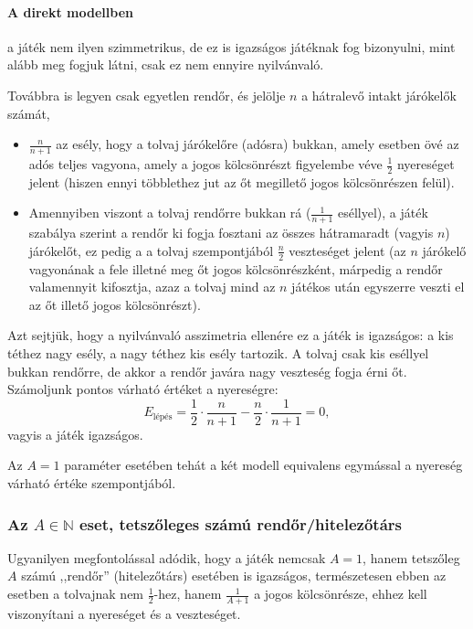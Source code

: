 \documentclass{article}
\begin{document}
	\paragraph{A direkt modellben} a játék nem ilyen szimmetrikus, de ez is igazságos játéknak fog bizonyulni, mint alább meg fogjuk látni, csak ez nem ennyire nyilvánvaló.

	Továbbra is legyen csak egyetlen rendőr, és jelölje $n$ a hátralevő intakt járókelők számát,
	\begin{itemize}	
		\item $\frac{n}{n+1}$ az esély, hogy a tolvaj járókelőre (adósra) bukkan, amely esetben övé az adós teljes vagyona, amely a jogos kölcsönrészt figyelembe véve $\frac12$ nyereséget jelent (hiszen ennyi többlethez jut az őt megillető jogos kölcsönrészen felül).
		\item Amennyiben viszont a tolvaj rendőrre bukkan rá ($\frac1{n+1}$ eséllyel), a játék szabálya szerint a rendőr ki fogja fosztani az összes hátramaradt (vagyis $n$) járókelőt, ez pedig a a tolvaj szempontjából $\frac n2$ veszteséget jelent (az $n$ járókelő vagyonának a fele illetné meg őt jogos kölcsönrészként, márpedig a rendőr valamennyit kifosztja, azaz a tolvaj mind az $n$ játékos után egyszerre veszti el az őt illető jogos kölcsönrészt).
	\end{itemize}
	Azt sejtjük, hogy a nyilvánvaló asszimetria ellenére ez a játék is igazságos: a kis téthez nagy esély, a nagy téthez kis esély tartozik. A tolvaj csak kis eséllyel bukkan rendőrre, de akkor a rendőr javára nagy veszteség fogja érni őt.
	Számoljunk pontos várható értéket a nyereségre:
	\[E_{\text{lépés}} = \frac12\cdot\frac{n}{n+1} - \frac n2\cdot\frac1{n+1} = 0,\]
	vagyis a játék igazságos.

	Az $A = 1$ paraméter esetében tehát a két modell equivalens egymással a nyereség várható értéke szempontjából.

	\subsubsection{Az $A\in \mathbb N$ eset, tetszőleges számú rendőr/hitelezőtárs}

	Ugyanilyen megfontolással adódik, hogy a játék nemcsak $A = 1$, hanem tetszőleg $A$ számú ,,rendőr'' (hitelezőtárs) esetében is igazságos, természetesen ebben az esetben a tolvajnak nem $\frac12$-hez, hanem $\frac1{A+1}$ a jogos kölcsönrésze, ehhez kell viszonyítani a nyereséget és a veszteséget.
\end{document}
